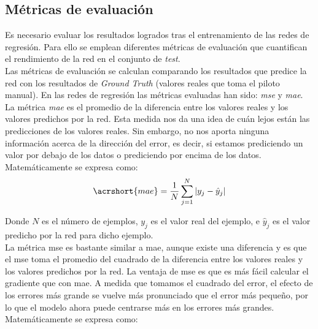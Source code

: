 \subsection{Métricas de evaluación}\label{metricas_reg}

Es necesario evaluar los resultados logrados tras el entrenamiento de las redes de regresión. Para ello se emplean diferentes métricas de evaluación que cuantifican el rendimiento de la red en el conjunto de \textit{test}.\\

Las métricas de evaluación se calculan comparando los resultados que predice la red con los resultados de \textit{Ground Truth} (valores reales que toma el piloto manual). En las redes de regresión las métricas evaluadas han sido: \textit{\acrfull{mse}} y \textit{\acrfull{mae}}. \\

La métrica \textit{\acrfull{mae}} es el promedio de la diferencia entre los valores reales y los valores predichos por la red. Esta medida nos da una idea de cuán lejos están las predicciones de los valores reales. Sin embargo, no nos aporta ninguna información acerca de la dirección del error, es decir, si estamos prediciendo un valor por debajo de los datos o prediciendo por encima de los datos. Matemáticamente se expresa como:\\

\begin{equation}\label{eq:mae_reg}
    \acrshort{mae} = \frac{1}{N}\sum_{j=1}^{N}|y_j - \hat{y}_j|
\end{equation}
\vspace{10pt}

Donde \(N\) es el número de ejemplos, \(y_j\) es el valor real del ejemplo, e \(\hat{y}_j\) es el valor predicho por la red para dicho ejemplo.\\

La métrica \acrfull{mse} es bastante similar a \acrfull{mae}, aunque existe una diferencia y es que el \acrshort{mse} toma el promedio del cuadrado de la diferencia entre los valores reales y los valores predichos por la red. La ventaja de \acrshort{mse} es que es más fácil calcular el gradiente que con \acrshort{mae}. A medida que tomamos el cuadrado del error, el efecto de los errores más grande se vuelve más pronunciado que el error más pequeño, por lo que el modelo ahora puede centrarse más en los errores más grandes. Matemáticamente se expresa como:\\

